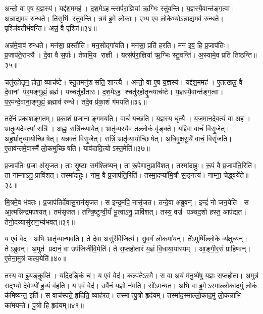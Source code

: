 अन्तो॒ वा ए॒ष य॒ज्ञस्य॑।
यद्द॑श॒ममह॑।
द॒श॒मेऽहन्त्सर्परा॒ज्ञिया॑ ऋ॒ग्भिः स्तु॑वन्ति।
य॒ज्ञस्यै॒वान्त॑ङ्ग॒त्वा।
अ॒न्नाद्य॒मव॑ रुन्धते।
ति॒सृभि॑ स्तुवन्ति।
त्रय॑ इ॒मे लो॒काः।
ए॒भ्य ए॒व लो॒केभ्यो॒ऽन्नाद्य॒मव॑ रुन्धते।
पृश्ञि॑वतीर्भवन्ति।
अन्नं॒ वै पृश्ञि॑॥३४॥

अन्न॑मे॒वाव॑ रुन्धते।
मन॑सा॒ प्रस्तौ॑ति।
मन॒सोद्गा॑यति।
मन॑सा॒ प्रति॑ हरति।
मन॑ इव॒ हि प्र॒जाप॑तिः।
प्र॒जाप॑ते॒राप्त्यै।
दे॒वा वै स॒र्पाः।
तेषा॑मि॒य राज्ञी।
यत्स॑र्परा॒ज्ञिया॑ ऋ॒ग्भिः स्तु॒वन्ति॑।
अ॒स्यामे॒व प्रति॑ तिष्ठन्ति॥३५॥

चतु॑र्‌होतॄ॒न्॒ होता॒ व्याच॑ष्टे।
स्तु॒तमनु॑शसति॒ शान्त्यै।
अन्तो॒ वा ए॒ष य॒ज्ञस्य॑।
यद्द॑श॒ममह॑।
ए॒तत्खलु॒ वै दे॒वानां पर॒मङ्गुह्यं॒ ब्रह्म॑।
यच्चतु॑र्होतारः।
द॒श॒मेऽह॒ श्चतु॑र्‌होतॄ॒न्व्याच॑ष्टे।
य॒ज्ञस्यै॒वान्त॑ङ्ग॒त्वा।
प॒र॒मन्दे॒वाना॒ङ्गुह्यं॒ ब्रह्माव॑ रुन्धे।
तदे॒व प्र॑का॒शं ग॑मयति॥३६॥

तदे॑नं प्रका॒शङ्ग॒तम्।
प्र॒का॒शं प्र॒जानाङ्गमयति।
वाचं॑ यच्छति।
य॒ज्ञस्य॒ धृत्यै।
य॒ज॒मा॒न॒दे॒व॒त्यं॑ वा अह॑।
भ्रा॒तृ॒व्य॒दे॒व॒त्या॑ रात्रि॑।
अह्ना॒ रात्रि॑न्ध्यायेत्।
भ्रातृ॑व्यस्यै॒व तल्लो॒कं वृ॑ङ्क्ते।
यद्दिवा॒ वाचं॑ विसृ॒जेत्।
अह॒र्भ्रातृ॑व्या॒योच्छिषेत्।
यन्नक्तं॑ विसृ॒जेत्।
रात्रिं॒ भ्रातृ॑व्या॒योच्छिषेत्।
अ॒धि॒वृ॒क्ष॒सू॒र्ये वाचं॒ विसृ॑जति।
ए॒ताव॑न्तमे॒वास्मै॑ लो॒कमुच्छिषति।
याव॑दादि॒त्योऽस्त॒मेति॑॥३७॥\anuvakamend[पृश्ञि॑ तिष्ठन्ति गमयति शिषे॒त्पञ्च॑ च]

प्र॒जाप॑तिः प्र॒जा अ॑सृजत।
ताः सृ॒ष्टाः सम॑श्लिष्यन्।
ता रू॒पेणानु॒प्रावि॑शत्।
तस्मा॑दाहुः।
रू॒पं वै प्र॒जाप॑ति॒रिति॑।
ता नाम्नाऽनु॒ प्रावि॑शत्।
तस्मा॑दाहुः।
नाम॒ वै प्र॒जाप॑ति॒रिति॑।
तस्मा॒दप्या॑मि॒त्रौ स॒ङ्गत्य॑।
नाम्ना॒ चेद्ध्वये॑ते॥३८॥

मि॒त्रमे॒व भ॑वतः।
प्र॒जाप॑तिर्देवासु॒रान॑सृजत।
स इन्द्र॒मपि॒ नासृ॑जत।
तन्दे॒वा अ॑ब्रुवन्।
इन्द्रं॑ नो जन॒येति॑।
स आ॒त्मन्निन्द्र॑मपश्यत्।
तम॑सृजत।
तन्त्रि॒ष्टुग्वी॒र्यं॑ भू॒त्वाऽनु॒ प्रावि॑शत्।
तस्य॒ वज्र॑ पञ्चद॒शो हस्त॒ आप॑द्यत।
तेनो॒दय्यासु॑रान॒भ्य॑भवत्॥३९॥

य ए॒वं वेद॑।
अ॒भि भ्रातृ॑व्यान्भवति।
ते दे॒वा असु॑रैर्वि॒जित्य॑।
सु॒व॒र्गं लो॒कमा॑यन्।
ते॑ऽमुष्मिँ॑ल्लो॒के व्य॑क्षुध्यन्।
तेऽब्रुवन्।
अ॒मुत॑ प्रदानं॒ वा उप॑जिजीवि॒मेति॑।
ते स॒प्तहो॑तारं य॒ज्ञं वि॒धाया॒यास्यम्।
आ॒ङ्गी॒र॒सं प्राहि॑ण्वन्।
ए॒तेना॒मुत्र॑ कल्प॒येति॑॥४०॥

तस्य॒ वा इ॒यङ्कॢप्ति॑।
यदि॒दङ्किं च॑।
य ए॒वं वेद॑।
कल्प॑तेऽस्मै।
स वा अ॒यं म॑नु॒ष्ये॑षु य॒ज्ञः स॒प्तहो॑ता।
अ॒मुत्र॑ स॒द्भ्यो दे॒वेभ्यो॑ ह॒व्यं व॑हति।
य ए॒वं वेद॑।
उपै॑नं य॒ज्ञो न॑मति।
सो॑ऽमन्यत।
अ॒भि वा इ॒मेऽस्माल्लो॒काद॒मुं लो॒कं क॑मिष्यन्त॒ इति॑।
स वाच॑स्पते॒ हृदिति॒ व्याह॑रत्।
तस्मात्पु॒त्रो हृद॑यम्।
तस्मा॑द॒स्माल्लो॒काद॒मुं लो॒कन्नाभि का॑मयन्ते।
पु॒त्रो हि हृद॑यम्॥४१॥\anuvakamend[ह्वये॑ते अभवत्कल्प॒येतीति॑ च॒त्वारि॑ च]

